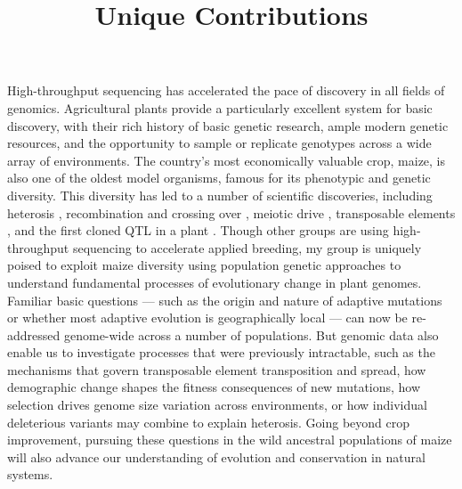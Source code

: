 \documentclass[11pt,letterpaper]{article}
\title{Unique Contributions}
\date{}
\begin{document}
\maketitle

\noindent High-throughput sequencing has accelerated the pace of discovery in all fields of genomics.
Agricultural plants provide a particularly excellent system for basic discovery, with their rich history of basic genetic research,  ample modern genetic resources, and the opportunity to sample or  replicate genotypes across a wide array of environments.
The country's most economically valuable crop, maize, is also one of the oldest model organisms, famous for its phenotypic and genetic diversity.
This diversity has led to a number of scientific discoveries, including heterosis \citep{shull1908composition}, recombination and crossing over \citep{creighton1931correlation}, meiotic drive \citep{rhoades1942preferential}, transposable elements \citep{mcclintock1950origin}, and the first cloned QTL in a plant \citep{doebley1997evolution}. 
Though other groups are using high-throughput sequencing to accelerate applied breeding, my group is uniquely poised to  exploit maize diversity using population genetic approaches to understand fundamental processes of evolutionary change in plant genomes.
Familiar basic questions --- such as the origin and nature of adaptive mutations or whether most adaptive evolution is  geographically local ---  can now be re-addressed  genome-wide across a number of populations.
But genomic data also enable us to investigate processes that were previously intractable, such as the mechanisms that govern transposable element transposition and spread, how demographic change shapes the fitness consequences of new mutations, how selection drives genome size variation across environments, or how individual deleterious variants may combine to explain heterosis.
Going beyond crop improvement, pursuing these questions in the wild ancestral populations of maize will also advance our understanding of evolution and conservation in natural systems.




\end{document}
